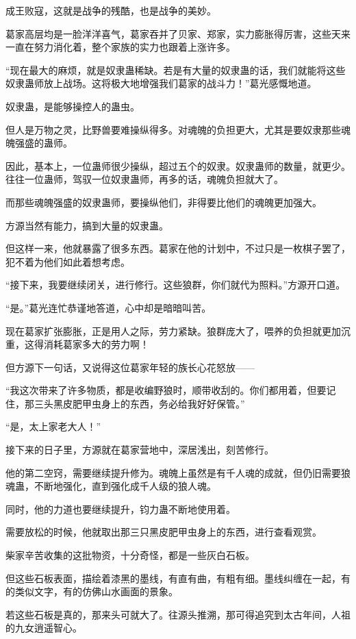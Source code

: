 \begin{this_body}
成王败寇，这就是战争的残酷，也是战争的美妙。

葛家高层均是一脸洋洋喜气，葛家吞并了贝家、郑家，实力膨胀得厉害，这些天来一直在努力消化着，整个家族的实力也跟着上涨许多。

“现在最大的麻烦，就是奴隶蛊稀缺。若是有大量的奴隶蛊的话，我们就能将这些奴隶蛊师放上战场。这将极大地增强我们葛家的战斗力！”葛光感慨地道。

奴隶蛊，是能够操控人的蛊虫。

但人是万物之灵，比野兽要难操纵得多。对魂魄的负担更大，尤其是要奴隶那些魂魄强盛的蛊师。

因此，基本上，一位蛊师很少操纵，超过五个的奴隶。奴隶蛊师的数量，就更少。往往一位蛊师，驾驭一位奴隶蛊师，再多的话，魂魄负担就大了。

而那些魂魄强盛的奴隶蛊师，要操纵他们，非得要比他们的魂魄更加强大。

方源当然有能力，搞到大量的奴隶蛊。

但这样一来，他就暴露了很多东西。葛家在他的计划中，不过只是一枚棋子罢了，犯不着为他们如此着想考虑。

“接下来，我要继续闭关，进行修行。这些狼群，你们就代为照料。”方源开口道。

“是。”葛光连忙恭谨地答道，心中却是暗暗叫苦。

现在葛家扩张膨胀，正是用人之际，劳力紧缺。狼群庞大了，喂养的负担就更加沉重，这得消耗葛家多大的劳力啊！

但方源下一句话，又说得这位葛家年轻的族长心花怒放——

“我这次带来了许多物质，都是收编野狼时，顺带收刮的。你们都用着，但要记住，那三头黑皮肥甲虫身上的东西，务必给我好好保管。”

“是，太上家老大人！”

接下来的日子里，方源就在葛家营地中，深居浅出，刻苦修行。

他的第二空窍，需要继续提升修为。魂魄上虽然是有千人魂的成就，但仍旧需要狼魂蛊，不断地强化，直到强化成千人级的狼人魂。

同时，他的力道也要继续提升，钧力蛊不断地使用着。

需要放松的时候，他就取出那三只黑皮肥甲虫身上的东西，进行查看观赏。

柴家辛苦收集的这批物资，十分奇怪，都是一些灰白石板。

但这些石板表面，描绘着漆黑的墨线，有直有曲，有粗有细。墨线纠缠在一起，有的类似文字，有的仿佛山水画面的景象。

若这些石板是真的，那来头可就大了。往源头推溯，那可得追究到太古年间，人祖的九女逍遥智心。


\end{this_body}
